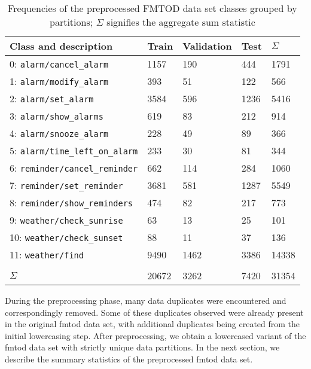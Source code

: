 \begin{table}[t!]
  \centering
  \begin{tabular}{lllll}
    \toprule
    Class and description & Train & Validation & Test & $\Sigma$ \\
    \midrule
    0: \texttt{alarm/cancel\_alarm} & 1157 & 190 & 444 & 1791 \\
    1: \texttt{alarm/modify\_alarm} & 393 & 51 & 122 & 566 \\
    2: \texttt{alarm/set\_alarm} & 3584 & 596 & 1236 & 5416 \\
    3: \texttt{alarm/show\_alarms} & 619 & 83 & 212 & 914 \\
    4: \texttt{alarm/snooze\_alarm} & 228 & 49 & 89 & 366 \\
    5: \texttt{alarm/time\_left\_on\_alarm} & 233 & 30 & 81 & 344 \\
    6: \texttt{reminder/cancel\_reminder} & 662 & 114 & 284 & 1060 \\
    7: \texttt{reminder/set\_reminder} & 3681 & 581 & 1287 & 5549 \\
    8: \texttt{reminder/show\_reminders} & 474 & 82 & 217 & 773 \\
    9: \texttt{weather/check\_sunrise} & 63 & 13 & 25 & 101 \\
    10: \texttt{weather/check\_sunset} & 88 & 11 & 37 & 136 \\
    11: \texttt{weather/find} & 9490 & 1462 & 3386 & 14338 \\[5pt]
    \hline \hline \\[-10pt]
    $\Sigma$ & 20672 & 3262 & 7420 & 31354 \\
    \bottomrule
  \end{tabular}
  \caption{Frequencies of the preprocessed FMTOD data set classes grouped by
    partitions; $\Sigma$ signifies the aggregate sum statistic}
  \label{tab:fmtod}
\end{table}

During the preprocessing phase, many data duplicates were encountered and
correspondingly removed. Some of these duplicates observed were already present
in the original \ac{fmtod} data set, with additional duplicates being created from
the initial lowercasing step. After preprocessing, we obtain a lowercased
variant of the \ac{fmtod} data set with strictly unique data partitions. In the next
section, we describe the summary statistics of the preprocessed \ac{fmtod} data set.

